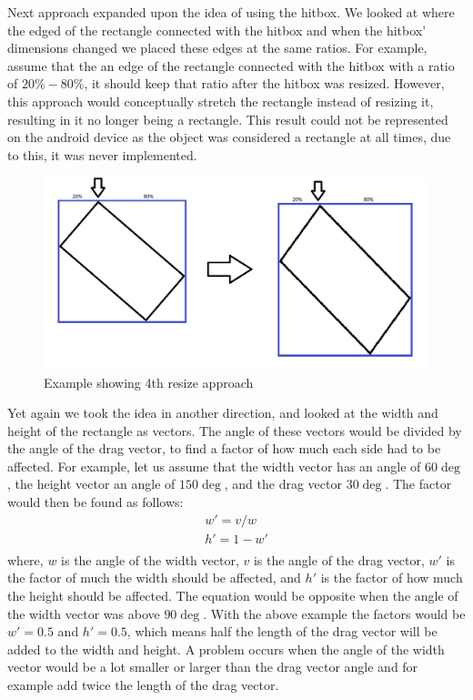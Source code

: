 Next approach expanded upon the idea of using the hitbox. 
We looked at where the edged of the rectangle connected with the hitbox and when the hitbox' dimensions changed we placed these edges at the same ratios.
For example, assume that the an edge of the rectangle connected with the hitbox with a ratio of $20\% - 80\%$, it should keep that ratio after the hitbox was resized.
However, this approach would conceptually stretch the rectangle instead of resizing it, resulting in it no longer being a rectangle.
This result could not be represented on the android device as the object was considered a rectangle at all times, due to this, it was never implemented.
\begin{figure}
\includegraphics[scale=0.5]{media/approach4}
\caption{Example showing 4th resize approach}
\label{fig:app4}
\end{figure}

Yet again we took the idea in another direction, and looked at the width and height of the rectangle as vectors.
The angle of these vectors would be divided by the angle of the drag vector, to find a factor of how much each side had to be affected.
For example, let us assume that the width vector has an angle of $60\deg$, the height vector an angle of $150\deg$, and the drag vector $30\deg$.
The factor would then be found as follows:
\begin{equation}
\begin{aligned}
w' = v / w\\
h' = 1 - w'\\
\end{aligned}
\end{equation}
where, $w$ is the angle of the width vector, $v$ is the angle of the drag vector, $w'$ is the factor of much the width should be affected, and $h'$ is the factor of how much the height should be affected.
The equation would be opposite when the angle of the width vector was above $90\deg$.
With the above example the factors would be $w' = 0.5$ and $h' = 0.5$, which means half the length of the drag vector will be added to the width and height.
A problem occurs when the angle of the width vector would be a lot smaller or larger than the drag vector angle and for example add twice the length of the drag vector.

